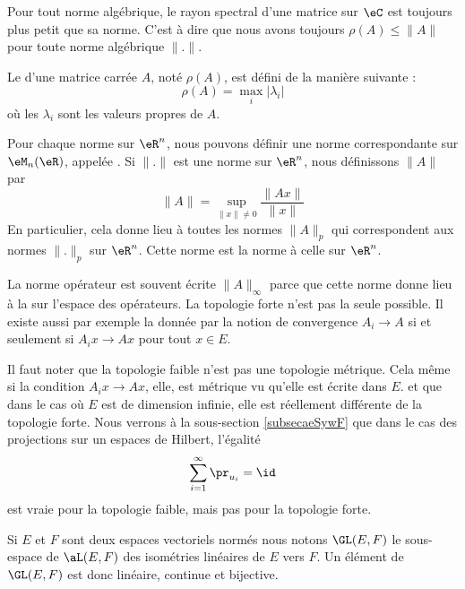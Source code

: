 \begin{proposition}
    Pour tout norme algébrique, le rayon spectral d'une matrice sur \( \eC\) est toujours plus petit que sa norme. C'est à dire que nous avons toujours \( \rho(A)\leq \| A \|\) pour toute norme algébrique \( \| . \|\).
\end{proposition}

\begin{definition}
    Le  d'une matrice carrée $A$, noté $\rho(A)$, est défini de la manière suivante :
    \begin{equation}
        \rho(A)=\max_i|\lambda_i|
    \end{equation}
    où les $\lambda_i$ sont les valeurs propres de $A$.
\end{definition}

\begin{example}     \label{ExemdefnormpMrt}
    Pour chaque norme sur \( \eR^n\), nous pouvons définir une norme correspondante sur \( \eM_n(\eR)\), appelée . Si \( \| . \|\) est une norme sur \( \eR^n\), nous définissons \( \| A \|\) par
    \begin{equation}\label{EqThUCEJ}
        \|A\|=\sup_{\|x\|\neq 0}\frac{\|Ax\|}{\|x\|}
    \end{equation}
    En particulier, cela donne lieu à toutes les normes \( \| A \|_p\) qui correspondent aux normes \( \| . \|_p\) sur \( \eR^n\). Cette norme est la norme  à celle sur \( \eR^n\).
\end{example}

La norme opérateur est souvent écrite \( \| A \|_{\infty}\) parce que cette norme donne lieu à la  sur l'espace des opérateurs. La topologie forte n'est pas la seule possible. Il existe aussi par exemple la  donnée par la notion de convergence \( A_i\to A\) si et seulement si \( A_ix\to Ax\) pour tout \( x\in E\).

Il faut noter que la topologie faible n'est pas une topologie métrique. Cela même si la condition \( A_ix\to Ax\), elle, est métrique vu qu'elle est écrite dans \( E\).
et que dans le cas où \( E\) est de dimension infinie, elle est réellement différente de la topologie forte. Nous verrons à la sous-section \ref{subsecaeSywF} que dans le cas des projections sur un espaces de Hilbert, l'égalité
\begin{equation}
    \sum_{i=1}^{\infty}\pr_{u_i}=\id
\end{equation}
est vraie pour la topologie faible, mais pas pour la topologie forte.
\begin{definition}
    Si \( E\) et \( F\) sont deux espaces vectoriels normés nous notons \( \GL(E,F)\) le sous-espace de \( \aL(E,F)\) des isométries linéaires de \( E\) vers \( F\). Un élément de \( \GL(E,F)\) est donc linéaire, continue et bijective.
\end{definition}

